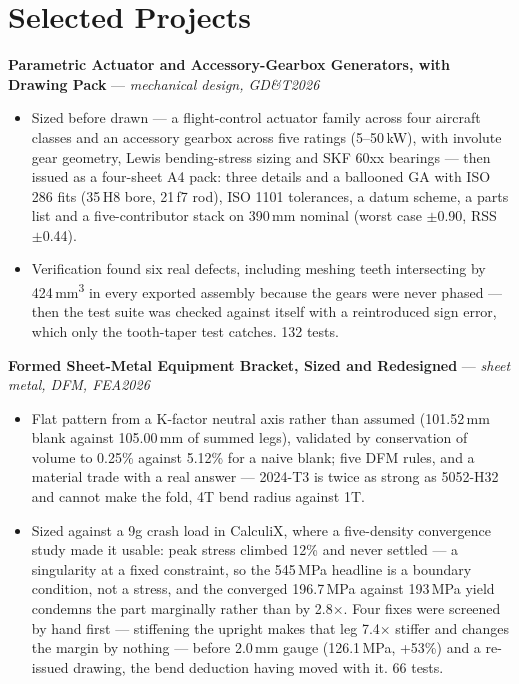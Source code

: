 \documentclass[10pt,a4paper]{article}
\newcommand{\project}[3]{%
  \vspace{0.12em}\textbf{#1} --- \textit{#2}\hfill \textit{#3}\\[0.1em]}
\begin{document}
\section{Selected Projects}

\project{Parametric Actuator and Accessory-Gearbox Generators, with Drawing Pack}{mechanical design, GD\&T}{2026}
\begin{itemize}
\item Sized before drawn --- a flight-control actuator family across four aircraft classes and an accessory gearbox across five ratings (5--50\,kW), with involute gear geometry, Lewis bending-stress sizing and SKF 60xx bearings --- then issued as a four-sheet A4 pack: three details and a ballooned GA with ISO 286 fits (35\,H8 bore, 21\,f7 rod), ISO 1101 tolerances, a datum scheme, a parts list and a five-contributor stack on 390\,mm nominal (worst case $\pm$0.90, RSS $\pm$0.44).
\item Verification found six real defects, including meshing teeth intersecting by 424\,mm\textsuperscript{3} in every exported assembly because the gears were never phased --- then the test suite was checked against itself with a reintroduced sign error, which only the tooth-taper test catches. 132 tests.
\end{itemize}

\project{Formed Sheet-Metal Equipment Bracket, Sized and Redesigned}{sheet metal, DFM, FEA}{2026}
\begin{itemize}
\item Flat pattern from a K-factor neutral axis rather than assumed (101.52\,mm blank against 105.00\,mm of summed legs), validated by conservation of volume to 0.25\% against 5.12\% for a naive blank; five DFM rules, and a material trade with a real answer --- 2024-T3 is twice as strong as 5052-H32 and cannot make the fold, 4T bend radius against 1T.
\item Sized against a 9g crash load in CalculiX, where a five-density convergence study made it usable: peak stress climbed 12\% and never settled --- a singularity at a fixed constraint, so the 545\,MPa headline is a boundary condition, not a stress, and the converged 196.7\,MPa against 193\,MPa yield condemns the part marginally rather than by 2.8$\times$. Four fixes were screened by hand first --- stiffening the upright makes that leg 7.4$\times$ stiffer and changes the margin by nothing --- before 2.0\,mm gauge (126.1\,MPa, +53\%) and a re-issued drawing, the bend deduction having moved with it. 66 tests.
\end{itemize}
\end{document}
